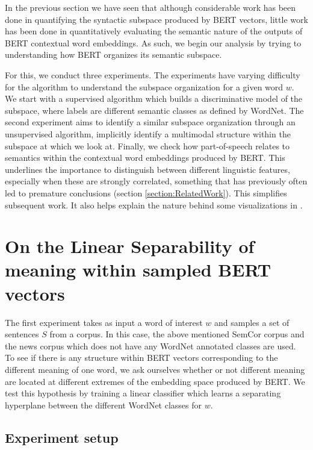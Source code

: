 \documentclass[a4paper,12pt,oneside,openright]{report}
\begin{document}
In the previous section we have seen that although considerable work has been done in quantifying the syntactic subspace produced by BERT vectors, little work has been done in quantitatively evaluating the semantic nature of the outputs of BERT contextual word embeddings.
As such, we begin our analysis by trying to understanding how BERT organizes its semantic subspace.

For this, we conduct three experiments.
The experiments have varying difficulty for the algorithm to understand the subspace organization for a given word $w$.
We start with a supervised algorithm which builds a discriminative model of the subspace, where labels are different semantic classes as defined by WordNet.
The second experiment aims to identify a similar subspace organization through an unsupervised algorithm, implicitly identify a multimodal structure within the subspace at which we look at.
Finally, we check how part-of-speech relates to semantics within the contextual word embeddings produced by BERT. 
This underlines the importance to distinguish between different linguistic features, especially when these are strongly correlated, something that has previously often led to premature conclusions (section \ref{section:RelatedWork}). 
This simplifies subsequent work.
It also helps explain the nature behind some visualizations in \cite{coenen19}.

\section{On the Linear Separability of meaning within sampled BERT vectors}\label{sec:linear_separability_experiment}

The first experiment takes as input a word of interest $w$ and samples a set of sentences $S$ from a corpus.
In this case, the above mentioned SemCor corpus and the news corpus \cite{news_corpus} which does not have any WordNet annotated classes are used.
To see if there is any structure within BERT vectors corresponding to the different meaning of one word, we ask ourselves whether or not different meaning are located at different extremes of the embedding space produced by BERT.
We test this hypothesis by training a linear classifier which learns a separating hyperplane between the different WordNet classes for $w$.

\subsection{Experiment setup}
\end{document}
